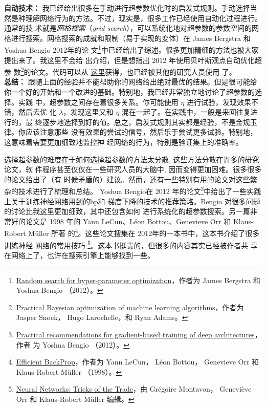 \textbf{自动技术：} 我已经给出很多在手动进行超参数优化时的启发式规则。手动选择当
然是种理解网络行为的方法。不过，现实是，很多工作已经使用自动化过程进行。通常的技
术就是\emph{网格搜索}（\emph{grid search}），可以系统化地对超参数的参数空间的网
格进行搜索。网格搜索的成就和限制（易于实现的变体）在 James Bergstra 和 Yoshua
Bengio $2012$年的论
文\footnote{\href{http://dl.acm.org/citation.cfm?id=2188395}{Random search for
    hyper-parameter optimization}，作者为 James Bergstra 和 Yoshua Bengio
  （2012）。}中已经给出了综述。很多更加精细的方法也被大家提出来了。我这里不会给
出介绍，但是想指出 2012 年使用贝叶斯观点自动优化超参
数\footnote{\href{http://papers.nips.cc/paper/4522-practical-bayesian-optimization-of-machine-learning-algorithms.pdf}{Practical
    Bayesian optimization of machine learning algorithms}，作者为 Jasper Snoek，
  Hugo Larochelle，和 Ryan Adams。}的论文。代码可以从%
\href{https://github.com/jaberg/hyperopt}{这里}获得，也已经被其他的研究人员使用
了。\\

\textbf{总结：} 跟随上面的经验并不能帮助你的网络给出绝对最优的结果。但是很可能给
你一个好的开始和一个改进的基础。特别地，我已经非常独立地讨论了超参数的选择。实践
中，超参数之间存在着很多关系。你可能使用 $\eta$ 进行试验，发现效果不错，然后去优
化 $\lambda$，发现这里又和 $\eta$ 混在一起了。在实践中，一般是来回往复进行的，最
终逐步地选择到好的值。总之，启发式规则其实都是经验，不是金规玉律。你应该注意那些
没有效果的尝试的信号，然后乐于尝试更多试验。特别地，这意味着需要更加细致地监控神
经网络的行为，特别是验证集上的准确率。

选择超参数的难度在于如何选择超参数的方法太分散, 这些方法分散在许多的研究论文，软
件程序甚至仅仅在一些研究人员的大脑中, 因而变得更加困难。很多很多的论文给出了（有
时候矛盾的）建议。然而，还有一些特别有用的论文对这些繁杂的技术进行了梳理和总结。
Yoshua Bengio在 2012 年的论文\footnote{\href{http://arxiv.org/abs/1206.5533}{Practical
    recommendations for gradient-based training of deep architectures}，作者
  为 Yoshua Bengio （2012）。}中给出了一些实践上关于训练神经网络用到的\gls*{bp}和
梯度下降的技术的推荐策略。Bengio 对很多问题的讨论比我这里更加细致，其中还包含如何
进行系统化的超参数搜索。另一篇非常好的论文是 1998 年的 Yann LeCun、Léon
Bottou、Genevieve Orr 和 Klaus-Robert Müller 所著
的\footnote{\href{http://yann.lecun.com/exdb/publis/pdf/lecun-98b.pdf}{Efficient
    BackProp}，作者为 Yann LeCun， Léon Bottou， Genevieve Orr 和 Klaus-Robert
  Müller （1998）。}。这些论文搜集在 2012年的一本书中，这本书介绍了很多训练神经
网络的常用技巧
\footnote{\href{http://www.springer.com/computer/theoretical+computer+science/book/978-3-642-35288-1}{Neural
    Networks: Tricks of the Trade}，由 Grégoire Montavon， Geneviève
  Orr 和 Klaus-Robert Müller 编辑。}。这本书挺贵的，但很多的内容其实已经被作者共
享在网络上了，也许在搜索引擎上能够找到一些。

